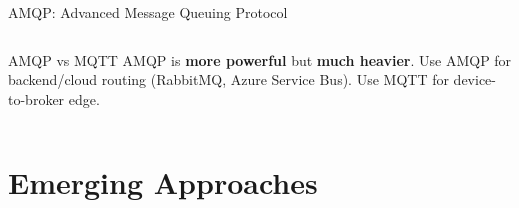 \documentclass[aspectratio=169,11pt]{beamer}
\begin{document}
\begin{frame}{AMQP: Advanced Message Queuing Protocol}
\begin{columns}
        \vspace{0.1cm}
        \begin{alertblock}{AMQP vs MQTT}
            AMQP is \textbf{more powerful} but \textbf{much heavier}. Use AMQP for backend/cloud routing (RabbitMQ, Azure Service Bus). Use MQTT for device-to-broker edge.
        \end{alertblock}
    \end{columns}
\end{frame}

\section{Emerging Approaches}
\end{document}
